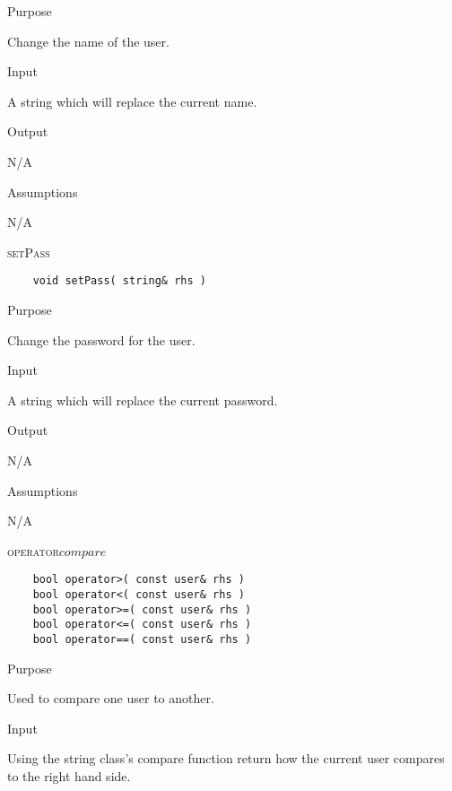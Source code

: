 \documentclass[pdftex, 12pt]{article}
\begin{document}
\begin{description}
\begin{description}
			\item{Purpose}

				Change the name of the user.

			\item{Input}

				A string which will replace the current name.

			\item{Output}

				N/A

			\item{Assumptions}

				N/A

		\end{description}
	\item{\textsc{setPass}}
\begin{lstlisting}
	void setPass( string& rhs )
\end{lstlisting}
		\begin{description}

			\item{Purpose}

				Change the password for the user.

			\item{Input}

				A string which will replace the current password.

			\item{Output}

				N/A

			\item{Assumptions}

				N/A

		\end{description}

	\item{\textsc{operator\(compare\)}}
\begin{lstlisting}
	bool operator>( const user& rhs )
	bool operator<( const user& rhs )
	bool operator>=( const user& rhs )
	bool operator<=( const user& rhs )
	bool operator==( const user& rhs )
\end{lstlisting}
		\begin{description}

			\item{Purpose}
				
				Used to compare one user to another.

			\item{Input}

				Using the string class's compare function return how the current user compares to the right hand side.


\end{description}
\end{description}
\end{document}
